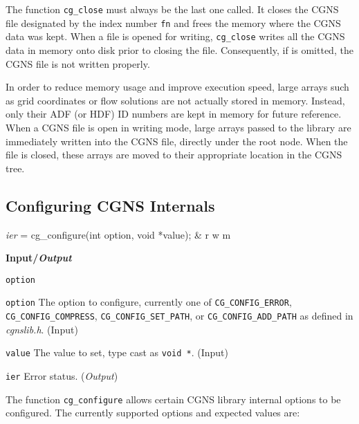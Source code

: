 The function \texttt{cg\_close} must always be the last one called.
It closes the CGNS file designated by the index number \texttt{fn} and
frees the memory where the CGNS data was kept.
When a file is opened for writing, \texttt{cg\_close} writes all the
CGNS data in memory onto disk prior to closing the file.
Consequently, if is omitted, the CGNS file is not written properly.

In order to reduce memory usage and improve execution speed,
large arrays such as grid coordinates or flow solutions are not actually
stored in memory.
Instead, only their ADF (or HDF) ID numbers are kept in memory for future
reference.
When a CGNS file is open in writing mode, large arrays passed to the
library are immediately written into the CGNS file, directly under the
root node.
When the file is closed, these arrays are moved to their appropriate
location in the CGNS tree.

\subsection{Configuring CGNS Internals}
\label{s:configure}

\begin{fctbox}
\textcolor{output}{\textit{ier}} = cg\_configure(\textcolor{input}{int option}, \textcolor{input}{void *value}); & r w m \\
\end{fctbox}

\noindent
\textbf{\textcolor{input}{Input}/\textcolor{output}{\textit{Output}}}

\begin{Ventryi}{\texttt{option}}\raggedright
\item [\texttt{option}]
      The option to configure, currently one of
      \texttt{CG\_CONFIG\_ERROR}, \texttt{CG\_CONFIG\_COMPRESS},
      \texttt{CG\_CONFIG\_SET\_PATH}, or \texttt{CG\_CONFIG\_ADD\_PATH}
      as defined in \textit{cgnslib.h}.
      (\textcolor{input}{Input})
\item [\texttt{value}]
      The value to set, type cast as \texttt{void *}.
      (\textcolor{input}{Input})
\item [\texttt{ier}]
      Error status.
      (\textcolor{output}{\textit{Output}})
\end{Ventryi}

The function \texttt{cg\_configure} allows certain CGNS library internal
options to be configured.
The currently supported options and expected values are:


